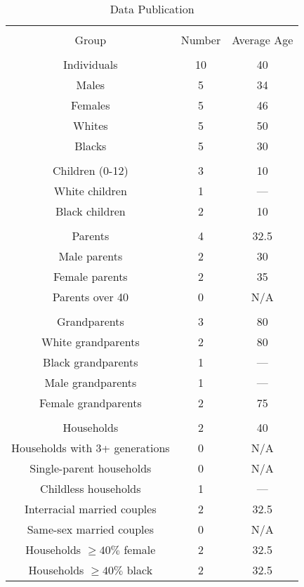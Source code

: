 \documentclass[jou,apacite]{apa6}
\begin{document}
\begin{table}[b]
\caption{Data Publication}\label{tab7}
\begin{tabular}{ccc}
\hline\\[-1.5ex]
Group & Number & Average Age \\[0.5ex]
\hline\\[-1.5ex]
Individuals & 10 & 40 \\[0.5ex]
Males & 5 & 34 \\[0.5ex]
Females & 5 & 46 \\[0.5ex]
Whites & 5 & 50 \\[0.5ex]
Blacks & 5 & 30 \\[0.5ex]
\hline\\[-1.5ex]
Children (0-12) & 3 & 10 \\[0.5ex]
White children & 1 & --- \\[0.5ex]
Black children & 2 & 10 \\[0.5ex]
\hline\\[-1.5ex]
Parents & 4 & 32.5 \\[0.5ex]
Male parents & 2 & 30 \\[0.5ex]
Female parents & 2 & 35 \\[0.5ex]
Parents over 40 & 0 & N/A \\[0.5ex]
\hline\\[-1.5ex]
Grandparents & 3 & 80 \\[0.5ex]
White grandparents & 2 & 80 \\[0.5ex]
Black grandparents & 1 & --- \\[0.5ex]
Male grandparents & 1 & --- \\[0.5ex]
Female grandparents & 2 & 75 \\[0.5ex]
\hline\\[-1.5ex]
Households & 2 & 40 \\[0.5ex]
Households with 3+ generations & 0 & N/A \\[0.5ex]
Single-parent households & 0 & N/A \\[0.5ex]
Childless households & 1 & --- \\[0.5ex]
Interracial married couples & 2 & 32.5 \\[0.5ex]
Same-sex married couples & 0 & N/A \\[0.5ex]
Households $\geq 40\% $ female & 2 & 32.5 \\[0.5ex]
Households $\geq 40\% $ black & 2 & 32.5 \\[0.5ex]

\hline
\end{tabular}
\end{table}
\end{document}
